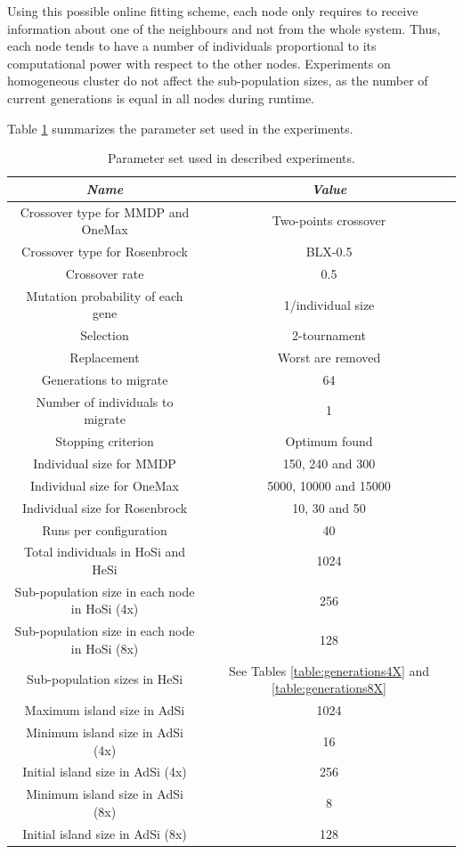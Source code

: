 \documentclass[final,1p,times]{elsarticle}
\begin{document}
Using this possible online fitting scheme, each node only requires to receive information about one of the neighbours and not from the whole system. Thus, each node tends to have a number of individuals proportional to its computational power with respect to the other nodes. Experiments on homogeneous cluster do not affect the sub-population sizes, as the number of current generations is equal in all nodes during runtime.

Table \ref{table:parameters} summarizes  the parameter set used in the experiments.

\begin{table}
\centering
\caption{Parameter set used in described experiments.}
\begin{tabular}{|c|c|} \hline
{\em Name} & {\em Value}\\ \hline \hline

Crossover type for MMDP and OneMax& Two-points crossover \\ \hline
Crossover type for Rosenbrock& BLX-0.5 \\ \hline
Crossover rate & 0.5\\ \hline
Mutation probability of each gene & 1/individual size\\ \hline
Selection & 2-tournament \\ \hline
Replacement & Worst are removed\\ \hline
Generations to migrate & 64 \\ \hline
Number of individuals to migrate & 1 \\ \hline
Stopping criterion & Optimum found \\ \hline
Individual size for MMDP & 150, 240 and 300  \\ \hline
Individual size for OneMax & 5000, 10000 and 15000 \\ \hline
Individual size for Rosenbrock & 10, 30 and 50 \\ \hline
Runs per configuration & 40 \\ \hline
\hline
Total individuals in HoSi and HeSi & 1024\\ \hline \hline
Sub-population size in each node in HoSi (4x) & 256  \\ \hline
Sub-population size in each node in HoSi (8x) & 128  \\ \hline
Sub-population sizes in HeSi & See Tables \ref{table:generations4X} and \ref{table:generations8X}\\ \hline
\hline
Maximum island size in AdSi & 1024 \\ \hline
Minimum island size in AdSi (4x) & 16 \\ \hline
Initial island size in AdSi (4x) & 256 \\ \hline 
Minimum island size in AdSi (8x) & 8 \\ \hline
Initial island size in AdSi (8x) & 128 \\ \hline 
\end{tabular}
\label{table:parameters}
\end{table}
\end{document}
